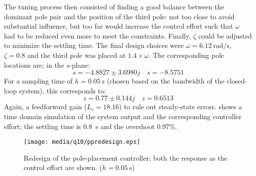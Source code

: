 The tuning process then consisted of finding a good balance between the dominant pole pair and the position of the third pole: not too close to avoid substantial influence, but too far would increase the control effort such that $\omega$ had to be reduced even more to meet the constraints. Finally, $\zeta$ could be adjusted to minimize the settling time. The final design choices were $\omega = \SI{6.12}{\radian\per\second}$, $\zeta = 0.8$ and the third pole was placed at $1.4\times\omega$. The corresponding pole locations are; in the $s$-plane:
$$ s = -4.8827 \pm 3.6980j  \quad s = -8.5751$$
For a sampling time of $h = \SI{0.05}{\second}$ (chosen based on the bandwidth of the closed-loop system), this corresponds to:
$$z = 0.77 \pm 0.144j \quad z = 0.6513$$
Again, a feedforward gain ($L_c = 18.16$) to rule out steady-state errors.  shows a time domain simulation of the system output and the corresponding controller effort; the settling time is \SI{0.8}{\second} and the overshoot 0.97\%.
\begin{figure}[ht]
    \centering
    \texttt{[image: media/q10/ppredesign.eps]}
    \caption{Redesign of the pole-placement controller; both the response as the control effort are shown. ($h = \SI{0.05}{\second}$)}
    \label{fig:q10_ppredesign}
\end{figure}
\FloatBarrier

